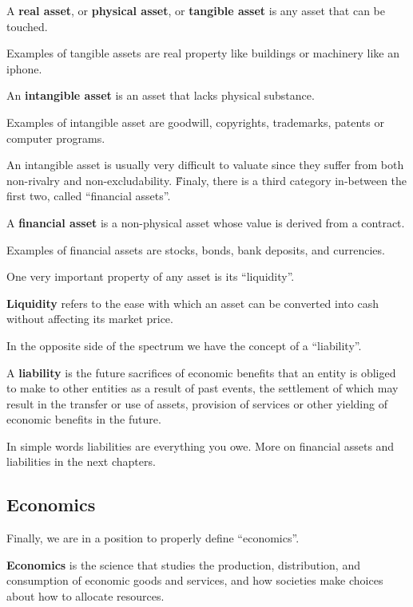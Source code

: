 A \textbf{real asset}, or \textbf{physical asset}, or \textbf{tangible asset} is any asset that can be touched.
\ed

\be
Examples of tangible assets are real property like buildings or machinery like an iphone.
\ee

An \textbf{intangible asset} is an asset that lacks physical substance.
\ed

\be
Examples of intangible asset are goodwill, copyrights, trademarks, patents or computer programs.
\ee

An intangible asset is usually very difficult to valuate since they suffer from both non-rivalry and non-excludability.
\v

Finaly, there is a third category in-between the first two, called ``financial assets''.

 \label{def:financial_asset}
A \textbf{financial asset} is a non-physical asset whose value is derived from a contract.
\ed

\be
Examples of financial assets are stocks, bonds, bank deposits, and currencies.
\ee

One very important property of any asset is its ``liquidity''.

\bd[Liquidity]
\textbf{Liquidity} refers to the ease with which an asset can be converted into cash without affecting its market price.
\ed

In the opposite side of the spectrum we have the concept of a ``liability''.

\bd[Liability] \label{def:liability}
A \textbf{liability} is the future sacrifices of economic benefits that an entity is obliged to make to other entities
as a result of past events, the settlement of which may result in the transfer or use of assets, provision of services
or other yielding of economic benefits in the future.
\ed

In simple words liabilities are everything you owe. More on financial assets and liabilities in the next chapters.

\subsection{Economics}

Finally, we are in a position to properly define ``economics''.

\bd[Economics]
\textbf{Economics} is the science that studies the production, distribution, and consumption of economic goods and
services, and how societies make choices about how to allocate resources.
\ed

